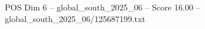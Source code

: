 \begin{textsample}{POS Dim 6 – global\_south\_2025\_06 – Score 16.00 – global\_south\_2025\_06/125687199.txt}
\end{textsample}

